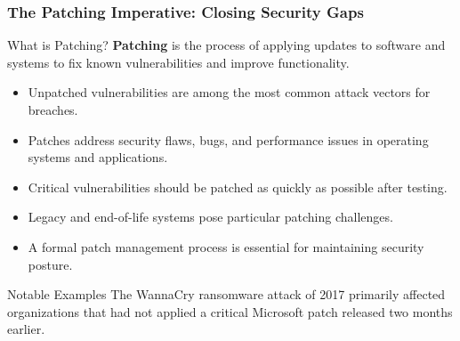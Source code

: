 \documentclass{beamer}
\begin{document}
    \begin{frame}
    \frametitle{The Patching Imperative: Closing Security Gaps}
    
    \begin{block}{What is Patching?}
    \textbf{Patching} is the process of applying updates to software and systems to fix known vulnerabilities and improve functionality.
    \end{block}
    
    \begin{itemize}
    \item Unpatched vulnerabilities are among the most common attack vectors for breaches.
    \item Patches address security flaws, bugs, and performance issues in operating systems and applications.
    \item Critical vulnerabilities should be patched as quickly as possible after testing.
    \item Legacy and end-of-life systems pose particular patching challenges.
    \item A formal patch management process is essential for maintaining security posture.
    \end{itemize}
    
    \begin{alertblock}{Notable Examples}
    The WannaCry ransomware attack of 2017 primarily affected organizations that had not applied a critical Microsoft patch released two months earlier.
    \end{alertblock}
    \end{frame}
    
\end{document}
